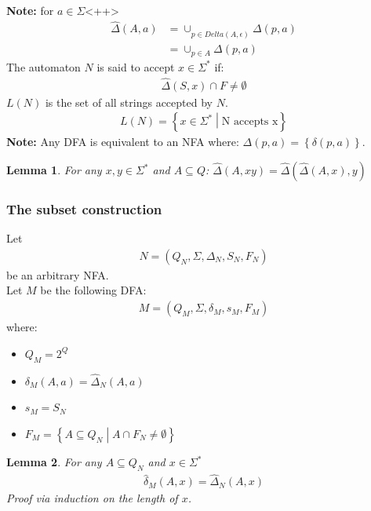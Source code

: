 \documentclass[a4paper]{article}
\newtheorem{lemma}{Lemma}
\begin{document}
        \\\textbf{Note:} for $a\in\Sigma$<++>
        \begin{align*}
            \hat{\Delta}(A,a)&=\cup_{p\in\hat{Delta}(A,\epsilon)}\Delta(p,a)\\
            &=\cup_{p\in A}\Delta(p,a)
        \end{align*}
        The automaton $N$ is said to accept $x\in\Sigma^*$ if:
        \begin{align*}
            \hat{\Delta}(S,x)\cap F \neq \emptyset
        \end{align*}
        $L(N)$ is the set of all strings accepted by $N$.
        \begin{align*}
            L(N)=\left\{ x\in\Sigma^* \middle | \mbox{N accepts x} \right\}
        \end{align*}
        \textbf{Note:} Any DFA is equivalent to an NFA where:
        $\Delta(p,a) = \left\{ \delta(p,a) \right\}$.
        \begin{lemma}
            For any $x,y\in\Sigma^*$ and $A\subseteq Q$: $\hat{\Delta}(A,xy)=\hat{\Delta}(\hat{\Delta}(A,x),y)$
        \end{lemma}
        \subsubsection{The subset construction}
        Let
        \begin{align*}
            N=(Q_N,\Sigma,\Delta_N,S_N,F_N)
        \end{align*}
        be an arbitrary NFA.\\
        Let $M$ be the following DFA:
        \begin{align*}
            M=(Q_M, \Sigma, \delta_M, s_M, F_M)
        \end{align*}
        where:
        \begin{itemize}
            \item $Q_M = 2^Q$
            \item $\delta_M(A,a)=\hat{\Delta}_N(A,a)$
            \item $s_M=S_N$
            \item $F_M=\left\{ A\subseteq Q_N \middle | A \cap F_N \neq \emptyset \right\}$
        \end{itemize}

        \begin{lemma}
            For any $A\subseteq Q_N$ and $x\in\Sigma^*$
            \begin{align*}
                \hat{\delta}_M(A,x) = \hat{\Delta}_N(A,x)
            \end{align*}
            Proof via induction on the length of $x$.
        \end{lemma}
\end{document}
